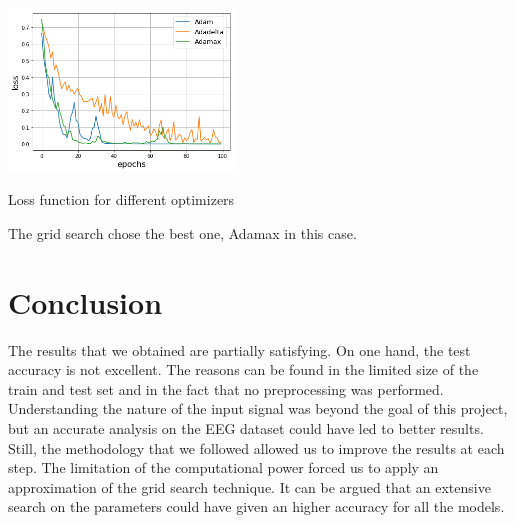 \documentclass[10pt,conference,compsocconf]{IEEEtran}
\begin{document}
\begin{center}
	\captionsetup{type=figure}
	\includegraphics[width=0.45\textwidth]{img/optimizationAdam.png}
	\caption {Loss function for different optimizers}
	\label{fig:CrossVal}
\end{center}
The grid search chose the best one, Adamax in this case.

\section{Conclusion}
\label{sec:conclusion}
The results that we obtained are partially satisfying. On one hand, the test accuracy is not excellent. The reasons can be found in the limited size of the train and test set and in the fact that no preprocessing was performed. Understanding the nature of the input signal was beyond the goal of this project, but an accurate analysis on the EEG dataset could have led to better results.\\
Still, the methodology that we followed allowed us to improve the results at each step. The limitation of the computational power forced us to apply an approximation of the grid search technique. It can be argued that an extensive search on the parameters could have given an higher accuracy for all the models.
\end{document}

